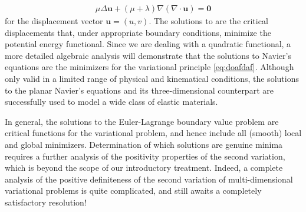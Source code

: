 \documentclass{article}
\begin{document}
\begin{exma}
\begin{align*}
\mu \Delta \mathbf{u}+(\mu+\lambda) \nabla(\nabla \cdot \mathbf{u})=\mathbf{0}
\end{align*}
for the displacement vector $\mathbf{u}=(u, v)$. The solutions to are the critical displacements that, under appropriate boundary conditions, minimize the potential energy functional.
Since we are dealing with a quadratic functional, a more detailed algebraic analysis will demonstrate that the solutions to Navier's equations are the minimizers for the variational principle \cref{eq:doafdaf}. Although only valid in a limited range of physical and kinematical conditions, the solutions to the planar Navier's equations and its three-dimensional counterpart are successfully used to model a wide class of elastic materials.
\end{exma}

In general, the solutions to the Euler-Lagrange boundary value problem are critical functions for the variational problem, and hence include all (smooth) local and global minimizers. Determination of which solutions are genuine minima requires a further analysis of the positivity properties of the second variation, which is beyond the scope of our introductory treatment. Indeed, a complete analysis of the positive definiteness of the second variation of multi-dimensional variational problems is quite complicated, and still awaits a completely satisfactory resolution!


\end{document}
